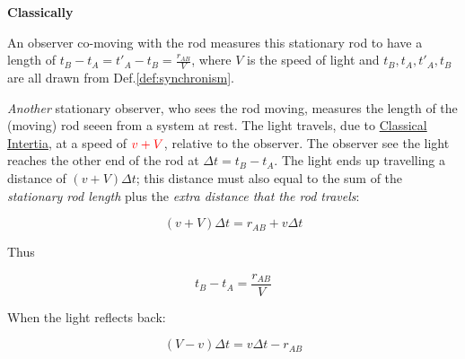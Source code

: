 \begin{tcolorbox}[
    breakable,
    parbox=false,
    skin=bicolor,
    sidebyside,
    boxrule=0pt,
    frame style={
        top color=blue!50!white
    },
    colback=red!5!white,
    colbacklower=green!5!white,
    title={Suppose the rod is moving in the x-direction at a constant speed $v$. Let the length of the moving rod, measured in the system at rest, be denoted as $r_{AB}$, where $A$ and $B$ are the two ends of the rod. In addition, we imagine that the two ends ($A$ and $B$) of the rod are equipped with clocks ($C_1$ and $C_2$) that are \textit{synchronous} with the clocks of the system at rest. Hence, \textbf{$C_1$ and $C_2$ are \textit{synchronous} for the observer in the system at rest}
whose readings always correspond to the "time of the system at rest"
at the}
]
    \begin{center}
        \textbf{Classically}
    \end{center}

    An observer co-moving with the rod measures this stationary rod to have a length of $t_B - t_A = t'_A - t_B = \frac{r_{AB}}{V}$, where $V$ is
    the speed of light and $t_B, t_A, t'_A, t_B$ are all drawn from Def.\ref{def:synchronism}.

    \textit{Another} stationary observer, who sees the rod moving, measures the length of the (moving) rod seeen from a
    system at rest. The light travels, due to
    \href{https://en.wikipedia.org/wiki/Inertia}{Classical Intertia}, at a speed of $ \color{red} v + V$, relative to
    the observer. The observer see the light reaches the other end of the rod at $\Delta t = t_B - t_A$. The light ends up
    travelling a distance of $(v + V)\Delta t$; this distance must also equal to the sum of the \textit{stationary rod
    length} plus the \textit{extra distance that the rod travels}:

    \begin{equation}
    (v + V)\Delta t = r_{AB} + v\Delta t
    \end{equation}

    Thus

    \begin{equation}
        t_B - t_A = \frac{r_{AB}}{V}
    \end{equation}

    When the light reflects back:

    \begin{equation}
    (V - v)\Delta t = v\Delta t - r_{AB}
    \end{equation}


\end{tcolorbox}
